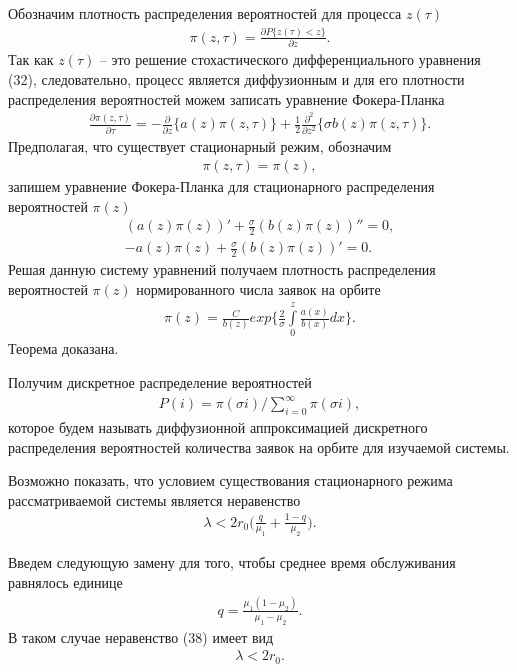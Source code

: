 Обозначим плотность распределения вероятностей для процесса $z(\tau)$
\begin{align*}
	\pi(z,\tau)=\frac{\partial P\{z(\tau)<z\}}{\partial z}.
\end{align*}
Так как $z(\tau)$ -- это решение стохастического дифференциального уравнения (32), следовательно, процесс является диффузионным и для его плотности распределения вероятностей можем записать уравнение Фокера-Планка
\begin{align}
	\frac{\partial \pi (z,\tau)}{\partial \tau}=-\frac{\partial}{\partial z}\{a(z)\pi(z,\tau)\} 
	+\frac{1}{2}\frac{\partial^2}{\partial z^2}\{\sigma b(z)\pi(z,\tau)\}.
\end{align}
Предполагая, что существует стационарный режим, обозначим 
\begin{align}
	\pi (z,\tau)=\pi(z),
\end{align}
запишем уравнение Фокера-Планка для стационарного распределения вероятностей $\pi{(z)}$
\begin{align*}
	(a(z)\pi(z))'+\frac{\sigma}{2}(b(z)\pi(z))''=0,\\
	-a(z)\pi(z)+\frac{\sigma}{2}(b(z)\pi(z))'=0.
\end{align*}
Решая данную систему уравнений получаем плотность распределения вероятностей $\pi{(z)}$ нормированного числа заявок на орбите
\begin{align}
	\pi (z)= \frac{C}{b(z)}exp\bigg\{\frac{2}{\sigma} \int\limits_0^z \frac{a(x)}{b(x)}dx\bigg\}.
\end{align} 
Теорема доказана.

Получим дискретное распределение вероятностей
\begin{align}
	P(i)=\pi(\sigma i)/\sum\limits_{i=0}^{\infty} \pi(\sigma i),
\end{align} 
которое будем называть диффузионной аппроксимацией дискретного распределения вероятностей количества заявок на орбите для изучаемой системы.

Возможно показать, что условием существования стационарного
режима рассматриваемой системы является неравенство 
\begin{align}
	\lambda<2r_{0}\bigg(\frac{q}{\mu_{1}}+\frac{1-q}{\mu_{2}}\bigg).
\end{align}

Введем следующую замену для того, чтобы среднее время обслуживания равнялось единице
\begin{align*}
	q=\frac{\mu_{1}(1-\mu_{2})}{\mu_{1}-\mu_{2}}.
\end{align*}
В таком случае неравенство (38) имеет вид
\begin{align*}
	\lambda<2r_{0}.
\end{align*}
	\newpage 

